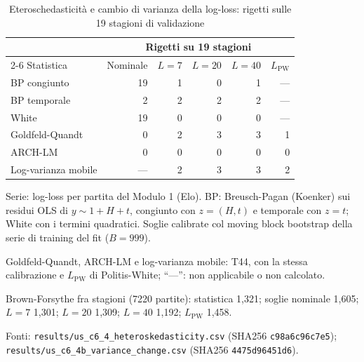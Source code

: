 \begin{table}[htbp]
\centering
\small
\caption{Eteroschedasticità e cambio di varianza della log-loss: rigetti sulle 19 stagioni di validazione}
\label{tab:c6_4_eteroschedasticita}
\begin{tabular}{lrrrrr}
\toprule
 & \multicolumn{5}{c}{Rigetti su 19 stagioni} \\
\cmidrule(lr){2-6}
Statistica & Nominale & $L = 7$ & $L = 20$ & $L = 40$ & $L_{\mathrm{PW}}$ \\
\midrule
BP congiunto & 19 & 1 & 0 & 1 & --- \\
BP temporale & 2 & 2 & 2 & 2 & --- \\
White & 19 & 0 & 0 & 0 & --- \\
Goldfeld-Quandt & 0 & 2 & 3 & 3 & 1 \\
ARCH-LM & 0 & 0 & 0 & 0 & 0 \\
Log-varianza mobile & --- & 2 & 3 & 3 & 2 \\
\bottomrule
\end{tabular}

\smallskip
\begin{minipage}{\linewidth}
\footnotesize
Serie: log-loss per partita del Modulo 1 (Elo). BP: Breusch-Pagan (Koenker) sui residui OLS di $y \sim 1 + H + t$, congiunto con $z = (H, t)$ e temporale con $z = t$; White con i termini quadratici. Soglie calibrate col moving block bootstrap della serie di training del fit ($B = 999$).\par
Goldfeld-Quandt, ARCH-LM e log-varianza mobile: T44, con la stessa calibrazione e $L_{\mathrm{PW}}$ di Politis-White; ``---'': non applicabile o non calcolato.\par
Brown-Forsythe fra stagioni (7220 partite): statistica 1,321; soglie nominale 1,605; $L = 7$ 1,301; $L = 20$ 1,309; $L = 40$ 1,192; $L_{\mathrm{PW}}$ 1,458.\par
Fonti: \texttt{results/us\_c6\_4\_heteroskedasticity.csv} (SHA256 \texttt{c98a6c96c7e5}); \texttt{results/us\_c6\_4b\_variance\_change.csv} (SHA256 \texttt{4475d96451d6}).
\end{minipage}
\end{table}
